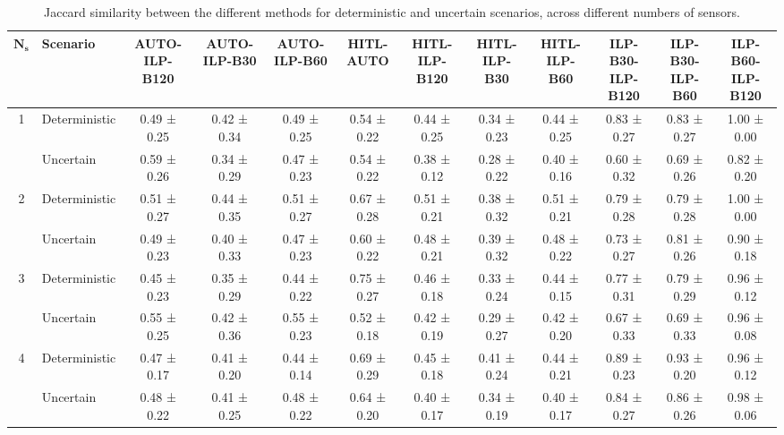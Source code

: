 \begin{table}[t]
\centering
\fontsize{6pt}{7.2pt}\selectfont 
\setlength{\tabcolsep}{2pt}
\begin{tabular}{cl|cccccccccc}
\toprule
$\boldsymbol{N_s}$ & \textbf{Scenario} & \textbf{AUTO-ILP-B120} & \textbf{AUTO-ILP-B30} & \textbf{AUTO-ILP-B60} & \textbf{HITL-AUTO} & \textbf{HITL-ILP-B120} & \textbf{HITL-ILP-B30} & \textbf{HITL-ILP-B60} & \textbf{ILP-B30-ILP-B120} & \textbf{ILP-B30-ILP-B60} & \textbf{ILP-B60-ILP-B120} \\
\midrule
\multirow{2}{*}{1} & Deterministic & 0.49 ± 0.25 & 0.42 ± 0.34 & 0.49 ± 0.25 & 0.54 ± 0.22 & 0.44 ± 0.25 & 0.34 ± 0.23 & 0.44 ± 0.25 & 0.83 ± 0.27 & 0.83 ± 0.27 & 1.00 ± 0.00 \\
 & Uncertain & 0.59 ± 0.26 & 0.34 ± 0.29 & 0.47 ± 0.23 & 0.54 ± 0.22 & 0.38 ± 0.12 & 0.28 ± 0.22 & 0.40 ± 0.16 & 0.60 ± 0.32 & 0.69 ± 0.26 & 0.82 ± 0.20 \\
\midrule
\multirow{2}{*}{2} & Deterministic & 0.51 ± 0.27 & 0.44 ± 0.35 & 0.51 ± 0.27 & 0.67 ± 0.28 & 0.51 ± 0.21 & 0.38 ± 0.32 & 0.51 ± 0.21 & 0.79 ± 0.28 & 0.79 ± 0.28 & 1.00 ± 0.00 \\
 & Uncertain & 0.49 ± 0.23 & 0.40 ± 0.33 & 0.47 ± 0.23 & 0.60 ± 0.22 & 0.48 ± 0.21 & 0.39 ± 0.32 & 0.48 ± 0.22 & 0.73 ± 0.27 & 0.81 ± 0.26 & 0.90 ± 0.18 \\
\midrule
\multirow{2}{*}{3} & Deterministic & 0.45 ± 0.23 & 0.35 ± 0.29 & 0.44 ± 0.22 & 0.75 ± 0.27 & 0.46 ± 0.18 & 0.33 ± 0.24 & 0.44 ± 0.15 & 0.77 ± 0.31 & 0.79 ± 0.29 & 0.96 ± 0.12 \\
 & Uncertain & 0.55 ± 0.25 & 0.42 ± 0.36 & 0.55 ± 0.23 & 0.52 ± 0.18 & 0.42 ± 0.19 & 0.29 ± 0.27 & 0.42 ± 0.20 & 0.67 ± 0.33 & 0.69 ± 0.33 & 0.96 ± 0.08 \\
\midrule
\multirow{2}{*}{4} & Deterministic & 0.47 ± 0.17 & 0.41 ± 0.20 & 0.44 ± 0.14 & 0.69 ± 0.29 & 0.45 ± 0.18 & 0.41 ± 0.24 & 0.44 ± 0.21 & 0.89 ± 0.23 & 0.93 ± 0.20 & 0.96 ± 0.12 \\
 & Uncertain & 0.48 ± 0.22 & 0.41 ± 0.25 & 0.48 ± 0.22 & 0.64 ± 0.20 & 0.40 ± 0.17 & 0.34 ± 0.19 & 0.40 ± 0.17 & 0.84 ± 0.27 & 0.86 ± 0.26 & 0.98 ± 0.06 \\
\bottomrule
\end{tabular}
\caption{Jaccard similarity between the different methods for deterministic and uncertain scenarios, across different numbers of sensors.}
\label{tab:jaccard_similarity}
\end{table}